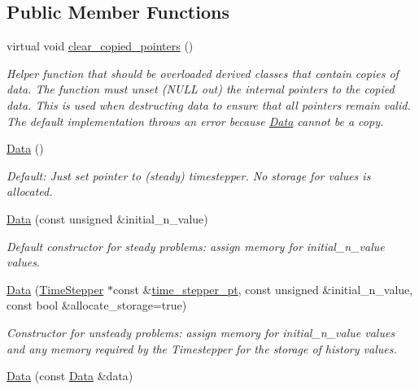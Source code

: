 \subsection*{Public Member Functions}
\begin{DoxyCompactItemize}
\item 
virtual void \hyperlink{classoomph_1_1Data_a409e3140829def2b1e738a24cc1f48bb}{clear\+\_\+copied\+\_\+pointers} ()
\begin{DoxyCompactList}\small\item\em Helper function that should be overloaded derived classes that contain copies of data. The function must unset (N\+U\+LL out) the internal pointers to the copied data. This is used when destructing data to ensure that all pointers remain valid. The default implementation throws an error because \hyperlink{classoomph_1_1Data}{Data} cannot be a copy. \end{DoxyCompactList}\item 
\hyperlink{classoomph_1_1Data_acbecfbd1dd3af51da9facdd897b64e74}{Data} ()
\begin{DoxyCompactList}\small\item\em Default\+: Just set pointer to (steady) timestepper. No storage for values is allocated. \end{DoxyCompactList}\item 
\hyperlink{classoomph_1_1Data_a352ab3876876780d366866704a29dbb0}{Data} (const unsigned \&initial\+\_\+n\+\_\+value)
\begin{DoxyCompactList}\small\item\em Default constructor for steady problems\+: assign memory for initial\+\_\+n\+\_\+value values. \end{DoxyCompactList}\item 
\hyperlink{classoomph_1_1Data_afe56d22d0dba308e33191e922993c5ee}{Data} (\hyperlink{classoomph_1_1TimeStepper}{Time\+Stepper} $\ast$const \&\hyperlink{classoomph_1_1Data_a5b34970d16205921dca3ada720da8445}{time\+\_\+stepper\+\_\+pt}, const unsigned \&initial\+\_\+n\+\_\+value, const bool \&allocate\+\_\+storage=true)
\begin{DoxyCompactList}\small\item\em Constructor for unsteady problems\+: assign memory for initial\+\_\+n\+\_\+value values and any memory required by the Timestepper for the storage of history values. \end{DoxyCompactList}\item 
\hyperlink{classoomph_1_1Data_a196816030b33f26c011cb45bce2f6897}{Data} (const \hyperlink{classoomph_1_1Data}{Data} \&data)

\end{DoxyCompactItemize}

